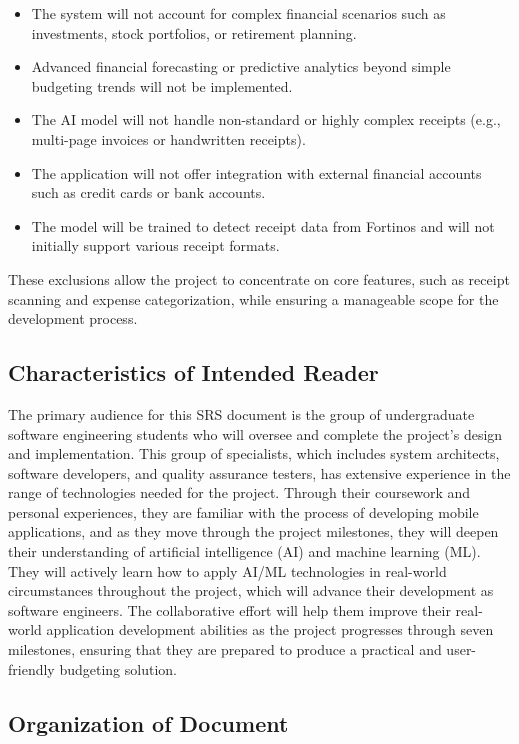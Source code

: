\documentclass[12pt]{article}
\begin{document}
\begin{itemize}
  \item The system will not account for complex financial scenarios such as investments, stock portfolios, or retirement planning.
  \item Advanced financial forecasting or predictive analytics beyond simple budgeting trends will not be implemented.
  \item The AI model will not handle non-standard or highly complex receipts (e.g., multi-page invoices or handwritten receipts).
  \item The application will not offer integration with external financial accounts such as credit cards or bank accounts.
  \item The model will be trained to detect receipt data from Fortinos and will not initially support various receipt formats.
\end{itemize}

\noindent These exclusions allow the project to concentrate on core features, such as receipt scanning and expense categorization, while ensuring a manageable scope for the development process.

\subsection{Characteristics of Intended Reader} \label{sec_IntendedReader}
The primary audience for this SRS document is the group of undergraduate
software engineering students who will oversee and complete the project’s design
and implementation. This group of specialists, which includes system architects,
software developers, and quality assurance testers, has extensive experience in
the range of technologies needed for the project. Through their coursework and
personal experiences, they are familiar with the process of developing mobile
applications, and as they move through the project milestones, they will deepen
their understanding of artificial intelligence (AI) and machine learning (ML).
They will actively learn how to apply AI/ML technologies in real-world
circumstances throughout the project, which will advance their development as
software engineers. The collaborative effort will help them improve their
real-world application development abilities as the project progresses through
seven milestones, ensuring that they are prepared to produce a practical and
user-friendly budgeting solution.
\subsection{Organization of Document}
\end{document}
